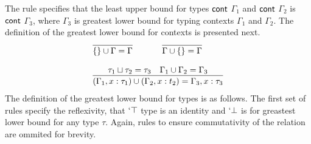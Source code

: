 \documentclass[review]{elsarticle}
\theoremstyle{definition}
\newcommand{\Con}[1]{\red{\mathsf{#1}}}
\begin{document}
The rule specifies that the least upper bound for types \ensuremath{\Con{cont}} $\Gamma_1$ and \ensuremath{\Con{cont}} $\Gamma_2$ is
\ensuremath{\Con{cont}} $\Gamma_3$, where $\Gamma_3$ is greatest lower bound for typing contexts $\Gamma_1$ and $\Gamma_2$.
The definition of the greatest lower bound for contexts is presented next.
\[
  \begin{array}{cc}
    \infer{\{\} \cup \Gamma = \Gamma}{} &
    \infer{\Gamma \cup \{\} = \Gamma}{} \\ & \\
    \multicolumn{2}{c}{
      \infer{(\Gamma_1 , x : \tau_1) \cup (\Gamma_2 , x : t_2) = \Gamma_3, x : \tau_3}
            {\tau_1 \sqcup \tau_2 = \tau_3 & \Gamma_1 \cup \Gamma_2 = \Gamma_3}
    }
  \end{array}
\]
The definition of the greatest lower bound for types is as follows. The first set of rules specify the reflexivity,
that $`\top$ type is an identity and $`\bot$ is for greastest lower bound for any type $\tau$.
Again, rules to ensure commutativity of the relation are ommited for brevity.
\end{document}
